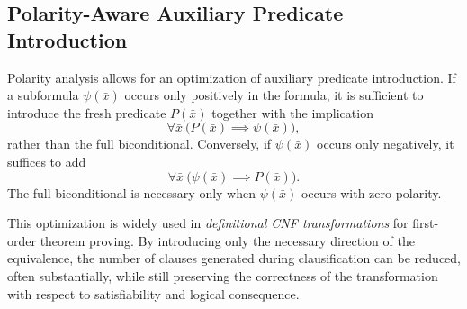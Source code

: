 \subsection{Polarity-Aware Auxiliary Predicate Introduction}\label{subsec:polarity-aware-auxiliary-predicate-introduction}

Polarity analysis allows for an optimization of auxiliary predicate introduction. If a subformula \(\psi(\bar{x})\) occurs only positively in the formula, it is sufficient to introduce the fresh predicate \(P(\bar{x})\) together with the implication
\[
\forall \bar{x}\ \big(P(\bar{x}) \implies \psi(\bar{x})\big),
\]
rather than the full biconditional. Conversely, if \(\psi(\bar{x})\) occurs only negatively, it suffices to add
\[
\forall \bar{x}\ \big(\psi(\bar{x}) \implies P(\bar{x})\big).
\]
The full biconditional is necessary only when \(\psi(\bar{x})\) occurs with zero polarity.

This optimization is widely used in \emph{definitional CNF transformations} for first-order theorem proving. By introducing only the necessary direction of the equivalence, the number of clauses generated during clausification can be reduced, often substantially, while still preserving the correctness of the transformation with respect to satisfiability and logical consequence.







